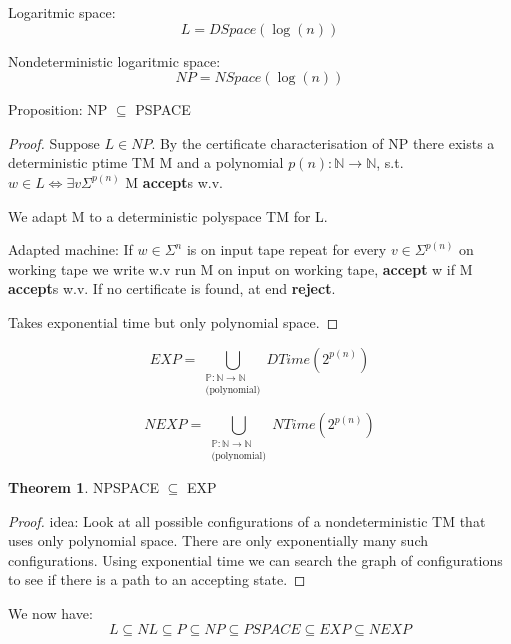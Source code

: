 \documentclass[a4paper,12pt]{article}
\theoremstyle{definition}
\newtheorem{theorem}[counter]{Theorem}
\theoremstyle{remark}
\newcommand{\N}{\mathbb{N}}
\newcommand{\Pp}{\mathbb{P}}
\begin{document}
Logaritmic space:
\begin{equation*}
    L = DSpace(\log(n))
\end{equation*}

Nondeterministic logaritmic space:
\begin{equation*}
    NP = NSpace(\log(n))
\end{equation*}


Proposition: NP $\subseteq$ PSPACE

\begin{proof}
    Suppose $L \in NP$. By the certificate characterisation of NP there exists a deterministic ptime TM M
    and a polynomial $p(n): \N \to \N$, s.t. $w \in L \iff \exists v \Sigma^{p(n)}$ M \textbf{accept}s w.v.

    We adapt M to a deterministic polyspace TM for L.

    Adapted machine:
    If $w \in \Sigma^n$ is on input tape repeat for every $v \in \Sigma^{p(n)}$ on working tape we write w.v run M on input on working tape, \textbf{accept} 
    w if M \textbf{accept}s w.v. If no certificate is found, at end \textbf{reject}.

    Takes exponential time but only polynomial space.
\end{proof}

\begin{equation*}
    EXP = \bigcup_{\substack{\Pp: \N \to \N \\ \text{(polynomial)}}} DTime(2^{p(n)})
\end{equation*}

\begin{equation*}
    NEXP = \bigcup_{\substack{\Pp: \N \to \N \\ \text{(polynomial)}}} NTime(2^{p(n)})
\end{equation*}


\begin{theorem}
    NPSPACE $\subseteq$ EXP
\end{theorem}

\begin{proof}
    idea: Look at all possible configurations of a nondeterministic TM that uses only polynomial space.
    There are only exponentially many such configurations. Using exponential time we can search the graph of configurations to see
    if there is a path to an accepting state.
\end{proof}

We now have:
\begin{equation*}
    L \subseteq NL \subseteq P \subseteq NP \subseteq PSPACE \subseteq EXP \subseteq NEXP
\end{equation*}
\end{document}
